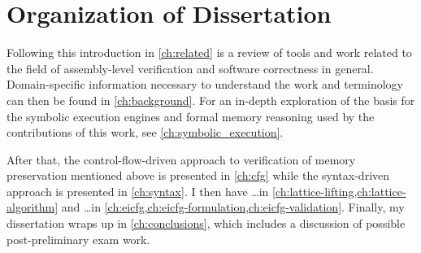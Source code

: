 \section{Organization of Dissertation}
Following this introduction in \cref{ch:related} is a review of tools and work
related to the field of assembly-level verification and software correctness in general.
Domain-specific information necessary to understand the work
and terminology can then be found in \cref{ch:background}.
For an in-depth exploration of the basis for the symbolic execution engines
and formal memory reasoning used by the contributions of this work,
see \cref{ch:symbolic_execution}.

After that, the control-flow-driven approach to verification of memory preservation
mentioned above is presented in \cref{ch:cfg}
while the syntax-driven approach is presented in \cref{ch:syntax}.
I then have \todo\dots in \cref{ch:lattice-lifting,ch:lattice-algorithm}
and \todo\dots in \cref{ch:eicfg,ch:eicfg-formulation,ch:eicfg-validation}.
Finally, my dissertation wraps up in \cref{ch:conclusions},
which includes a discussion of possible post-preliminary exam work.
